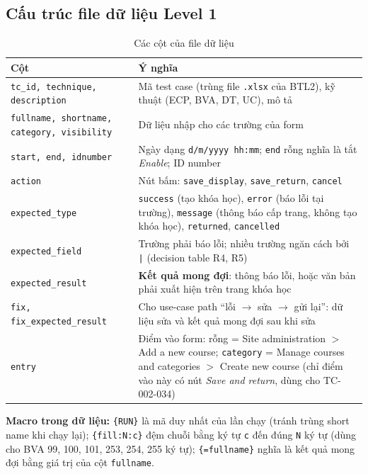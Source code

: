 \subsection{Cấu trúc file dữ liệu Level 1}
\begin{table}[H]
\centering\footnotesize
\begin{tabular}{|l|L{11.5cm}|}
\hline
{}\textbf{Cột} & \textbf{Ý nghĩa} \\ \hline
\texttt{tc\_id, technique, description} & Mã test case (trùng file \texttt{.xlsx} của BTL2), kỹ thuật (ECP, BVA, DT, UC), mô tả \\ \hline
\texttt{fullname, shortname, category, visibility} & Dữ liệu nhập cho các trường của form \\ \hline
\texttt{start, end, idnumber} & Ngày dạng \texttt{d/m/yyyy hh:mm}; \texttt{end} rỗng nghĩa là tắt \textit{Enable}; ID number \\ \hline
\texttt{action} & Nút bấm: \texttt{save\_display}, \texttt{save\_return}, \texttt{cancel} \\ \hline
\texttt{expected\_type} & \texttt{success} (tạo khóa học), \texttt{error} (báo lỗi tại trường), \texttt{message} (thông báo cấp trang, không tạo khóa học), \texttt{returned}, \texttt{cancelled} \\ \hline
\texttt{expected\_field} & Trường phải báo lỗi; nhiều trường ngăn cách bởi \texttt{|} (decision table R4, R5) \\ \hline
\texttt{expected\_result} & \textbf{Kết quả mong đợi}: thông báo lỗi, hoặc văn bản phải xuất hiện trên trang khóa học \\ \hline
\texttt{fix, fix\_expected\_result} & Cho use-case path ``lỗi $\rightarrow$ sửa $\rightarrow$ gửi lại'': dữ liệu sửa và kết quả mong đợi sau khi sửa \\ \hline
\texttt{entry} & Điểm vào form: rỗng = Site administration $>$ Add a new course; \texttt{category} = Manage courses and categories $>$ Create new course (chỉ điểm vào này có nút \textit{Save and return}, dùng cho TC-002-034) \\ \hline
\end{tabular}
\caption{Các cột của file dữ liệu}
\end{table}
\textbf{Macro trong dữ liệu:} \texttt{\{RUN\}} là mã duy nhất của lần chạy (tránh trùng short name khi chạy lại);
\texttt{\{fill:N:c\}} đệm chuỗi bằng ký tự \texttt{c} đến đúng \texttt{N} ký tự (dùng cho BVA 99, 100, 101, 253, 254, 255 ký tự);
\texttt{\{=fullname\}} nghĩa là kết quả mong đợi bằng giá trị của cột \texttt{fullname}.

